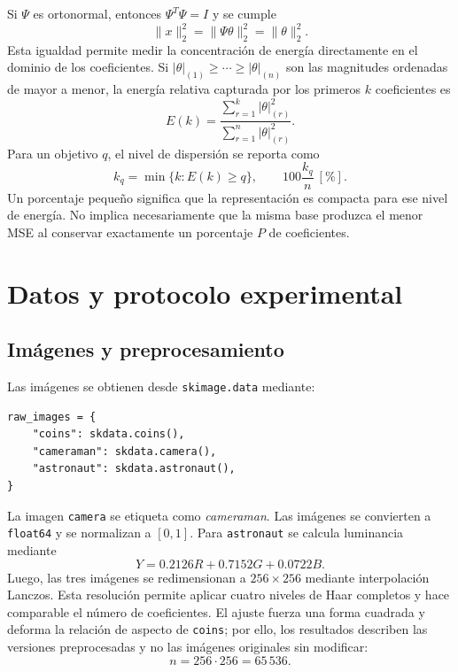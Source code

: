 \documentclass[11pt,a4paper]{article}
\begin{document}
Si $\Psi$ es ortonormal, entonces $\Psi^T\Psi=I$ y se cumple
\begin{equation}
    \lVert x\rVert_2^2=\lVert\Psi\theta\rVert_2^2=\lVert\theta\rVert_2^2.
    \label{eq:parseval}
\end{equation}
Esta igualdad permite medir la concentración de energía directamente en el dominio de los coeficientes. Si $|\theta|_{(1)}\geq\cdots\geq|\theta|_{(n)}$ son las magnitudes ordenadas de mayor a menor, la energía relativa capturada por los primeros $k$ coeficientes es
\begin{equation}
    E(k)=\frac{\displaystyle\sum_{r=1}^{k}|\theta|_{(r)}^2}
    {\displaystyle\sum_{r=1}^{n}|\theta|_{(r)}^2}.
    \label{eq:energy}
\end{equation}
Para un objetivo $q$, el nivel de dispersión se reporta como
\begin{equation}
    k_q=\min\{k:E(k)\geq q\},
    \qquad
    100\frac{k_q}{n}\ [\%].
    \label{eq:kq}
\end{equation}
Un porcentaje pequeño significa que la representación es compacta para ese nivel de energía. No implica necesariamente que la misma base produzca el menor MSE al conservar exactamente un porcentaje $P$ de coeficientes.

\section{Datos y protocolo experimental}

\subsection{Imágenes y preprocesamiento}

Las imágenes se obtienen desde \texttt{skimage.data} mediante:
\begin{lstlisting}
raw_images = {
    "coins": skdata.coins(),
    "cameraman": skdata.camera(),
    "astronaut": skdata.astronaut(),
}
\end{lstlisting}
La imagen \texttt{camera} se etiqueta como \textit{cameraman}. Las imágenes se convierten a \texttt{float64} y se normalizan a $[0,1]$. Para \texttt{astronaut} se calcula luminancia mediante
\begin{equation}
    Y=0.2126R+0.7152G+0.0722B.
    \label{eq:luminancia}
\end{equation}
Luego, las tres imágenes se redimensionan a $256\times256$ mediante interpolación Lanczos. Esta resolución permite aplicar cuatro niveles de Haar completos y hace comparable el número de coeficientes. El ajuste fuerza una forma cuadrada y deforma la relación de aspecto de \texttt{coins}; por ello, los resultados describen las versiones preprocesadas y no las imágenes originales sin modificar:
\begin{equation}
    n=256\cdot256=65\,536.
    \label{eq:ncoef}
\end{equation}
\end{document}
